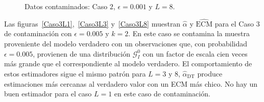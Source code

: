 \begin{figure}[H]
	\caption{\label{Caso2L8}\small Datos contaminados: Caso $2$, $\epsilon=0.001$  y $L=8$.}
\end{figure}

Las figuras~\ref{Caso3L1},~\ref{Caso3L3} y~\ref{Caso3L8} muestran $\widehat{\alpha}$ y $\widehat{\text{ECM}}$ para el Caso 3 de contaminación con $\epsilon=0.005$ y $k=2$. En este caso se contamina la muestra proveniente del modelo verdadero con un observaciones que, con probabilidad $\epsilon=0.005$, provienen de una distribución $\mathcal G_I^0$ con un factor de escala cien veces más grande que el correspondiente al modelo verdadero. El comportamiento de estos estimadores sigue el mismo patrón para $L=3 \text{ y } 8$, $\widehat\alpha_{\text{DT}}$ produce estimaciones más cercanas al verdadero valor con un ECM más chico. No hay un buen estimador para el caso $L=1$ en este caso de contaminación.

